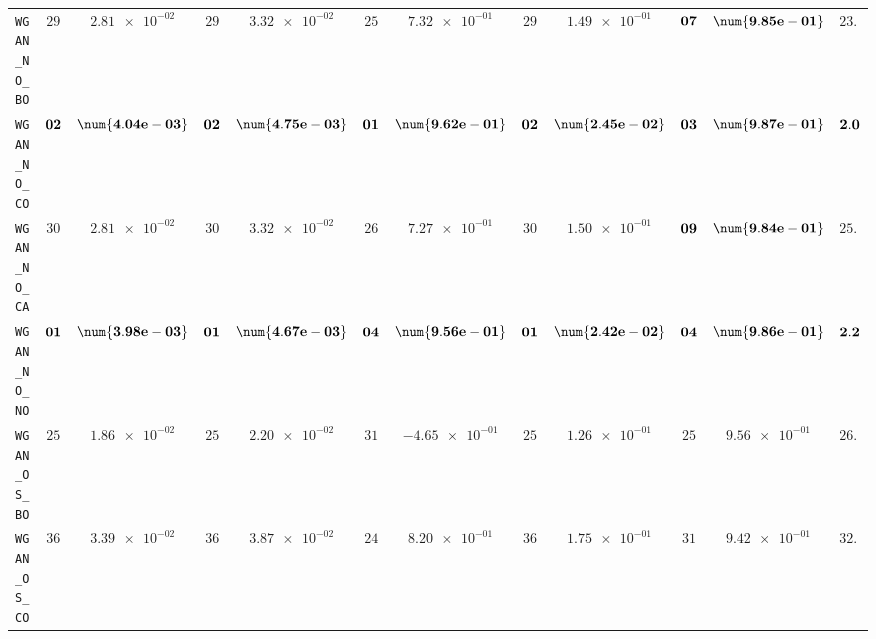 \begin{table}[H]
\begin{tabularx}{\textwidth}{l||cC|cC|cC|cC|cC||c}
		\texttt{WGAN\_NO\_BO} & $ 29$ & $ \num{2.81e-02}$ & $ 29$ & $ \num{3.32e-02}$ & $ 25$ & $ \num{7.32e-01}$ & $ 29$ & $ \num{1.49e-01}$ & $\bf 07$ & $\bf \num{9.85e-01}$ & $ 23.8$  \\
		\texttt{WGAN\_NO\_CO} & $\bf 02$ & $\bf \num{4.04e-03}$ & $\bf 02$ & $\bf \num{4.75e-03}$ & $\bf 01$ & $\bf \num{9.62e-01}$ & $\bf 02$ & $\bf \num{2.45e-02}$ & $\bf 03$ & $\bf \num{9.87e-01}$ & $\bf 2.0$  \\
		\texttt{WGAN\_NO\_CA} & $ 30$ & $ \num{2.81e-02}$ & $ 30$ & $ \num{3.32e-02}$ & $ 26$ & $ \num{7.27e-01}$ & $ 30$ & $ \num{1.50e-01}$ & $\bf 09$ & $\bf \num{9.84e-01}$ & $ 25.0$  \\
		\texttt{WGAN\_NO\_NO} & $\bf 01$ & $\bf \num{3.98e-03}$ & $\bf 01$ & $\bf \num{4.67e-03}$ & $\bf 04$ & $\bf \num{9.56e-01}$ & $\bf 01$ & $\bf \num{2.42e-02}$ & $\bf 04$ & $\bf \num{9.86e-01}$ & $\bf 2.2$  \\
		\texttt{WGAN\_OS\_BO} & $ 25$ & $ \num{1.86e-02}$ & $ 25$ & $ \num{2.20e-02}$ & $ 31$ & $ \num{-4.65e-01}$ & $ 25$ & $ \num{1.26e-01}$ & $ 25$ & $ \num{9.56e-01}$ & $ 26.2$  \\
		\texttt{WGAN\_OS\_CO} & $ 36$ & $ \num{3.39e-02}$ & $ 36$ & $ \num{3.87e-02}$ & $ 24$ & $ \num{8.20e-01}$ & $ 36$ & $ \num{1.75e-01}$ & $ 31$ & $ \num{9.42e-01}$ & $ 32.6$  \\

\end{tabularx}
\end{table}

